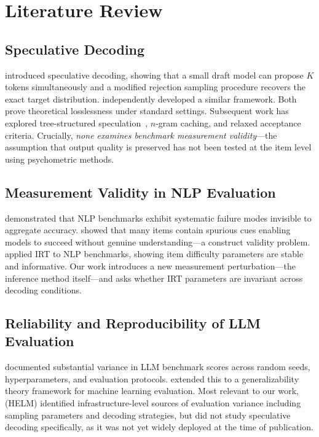 \documentclass{article}
\begin{document}
\section{Literature Review}

\subsection{Speculative Decoding}

\citet{leviathan2023fast} introduced speculative decoding, showing that a small draft model can propose $K$ tokens simultaneously and a modified rejection sampling procedure recovers the exact target distribution. \citet{chen2023accelerating} independently developed a similar framework. Both prove theoretical losslessness under standard settings. Subsequent work has explored tree-structured speculation~\citep{miao2024specinfer}, $n$-gram caching, and relaxed acceptance criteria. Crucially, \emph{none examines benchmark measurement validity}---the assumption that output quality is preserved has not been tested at the item level using psychometric methods.

\subsection{Measurement Validity in NLP Evaluation}

\citet{ribeiro2020beyond} demonstrated that NLP benchmarks exhibit systematic failure modes invisible to aggregate accuracy. \citet{gururangan2018annotation} showed that many items contain spurious cues enabling models to succeed without genuine understanding---a construct validity problem. \citet{ethayarajh2022authenticity} applied IRT to NLP benchmarks, showing item difficulty parameters are stable and informative. Our work introduces a new measurement perturbation---the inference method itself---and asks whether IRT parameters are invariant across decoding conditions.

\subsection{Reliability and Reproducibility of LLM Evaluation}

\citet{dodge2020fine} documented substantial variance in LLM benchmark scores across random seeds, hyperparameters, and evaluation protocols. \citet{bouthillier2021accounting} extended this to a generalizability theory framework for machine learning evaluation. Most relevant to our work, \citet{liang2022holistic} (HELM) identified infrastructure-level sources of evaluation variance including sampling parameters and decoding strategies, but did not study speculative decoding specifically, as it was not yet widely deployed at the time of publication.
\end{document}
